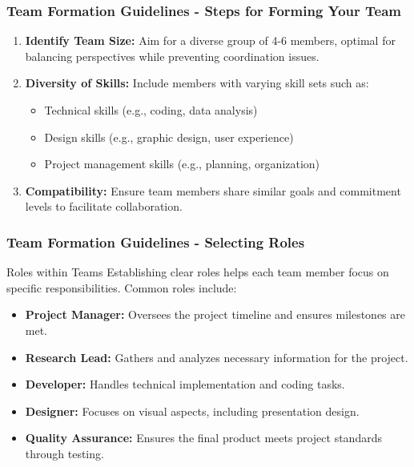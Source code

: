 \documentclass[aspectratio=169]{beamer}
\begin{document}
\begin{frame}[fragile]
    \frametitle{Team Formation Guidelines - Steps for Forming Your Team}
    \begin{enumerate}
        \item \textbf{Identify Team Size:}
            Aim for a diverse group of 4-6 members, optimal for balancing perspectives while preventing coordination issues.
        \item \textbf{Diversity of Skills:}
            Include members with varying skill sets such as:
            \begin{itemize}
                \item Technical skills (e.g., coding, data analysis)
                \item Design skills (e.g., graphic design, user experience)
                \item Project management skills (e.g., planning, organization)
            \end{itemize}
        \item \textbf{Compatibility:}
            Ensure team members share similar goals and commitment levels to facilitate collaboration.
    \end{enumerate}
\end{frame}

\begin{frame}[fragile]
    \frametitle{Team Formation Guidelines - Selecting Roles}
    \begin{block}{Roles within Teams}
        Establishing clear roles helps each team member focus on specific responsibilities. Common roles include:
        \begin{itemize}
            \item \textbf{Project Manager:} Oversees the project timeline and ensures milestones are met.
            \item \textbf{Research Lead:} Gathers and analyzes necessary information for the project.
            \item \textbf{Developer:} Handles technical implementation and coding tasks.
            \item \textbf{Designer:} Focuses on visual aspects, including presentation design.
            \item \textbf{Quality Assurance:} Ensures the final product meets project standards through testing.
        \end{itemize}
    \end{block}
\end{frame}
\end{document}
